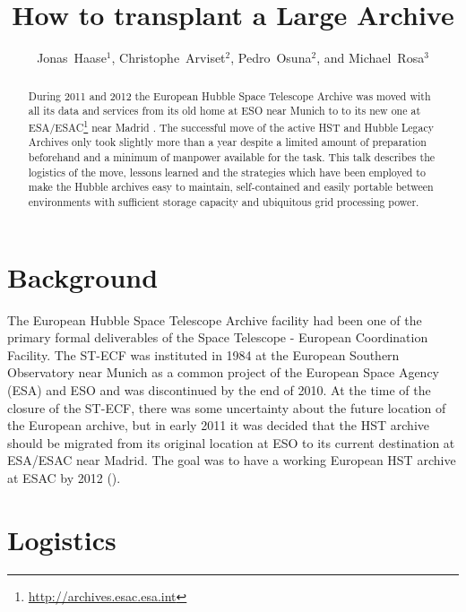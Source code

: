 \documentclass[11pt,twoside]{article}  %
\begin{document}

\title{How to transplant a Large Archive}
\author{Jonas~Haase$^1$, Christophe~Arviset$^2$, Pedro~Osuna$^2$, and Michael~Rosa$^3$}

\begin{abstract}
During 2011 and 2012 the European Hubble Space Telescope Archive was moved with all its data and services from its old home at ESO near Munich to to its new one at ESA/ESAC\footnote{\url{http://archives.esac.esa.int}} near Madrid . The successful move of the active HST and Hubble Legacy Archives only took slightly more than a year despite a limited amount of preparation beforehand and a minimum of manpower available for the task.
This talk describes the logistics of the move, lessons learned and the strategies which have been employed to make the Hubble archives easy to maintain, self-contained and easily portable between environments with sufficient storage capacity and ubiquitous grid processing power.


\end{abstract}

\section{Background}

The European Hubble Space Telescope Archive facility had been one of the primary formal deliverables of the Space Telescope - European Coordination Facility. The ST-ECF was instituted in 1984 at the European Southern Observatory near Munich as a common project of the European Space Agency (ESA) and ESO and was discontinued by the end of 2010. 
At the time of the closure of the ST-ECF, there was some uncertainty about the future location of the European archive, but in early 2011 it was decided that the HST archive should be migrated from its original location at ESO to its current destination at ESA/ESAC near Madrid. The goal was to have a working European HST archive at ESAC by 2012 (\cite{2012ASPC..461..677H}). 

\section{Logistics}
\end{document}
